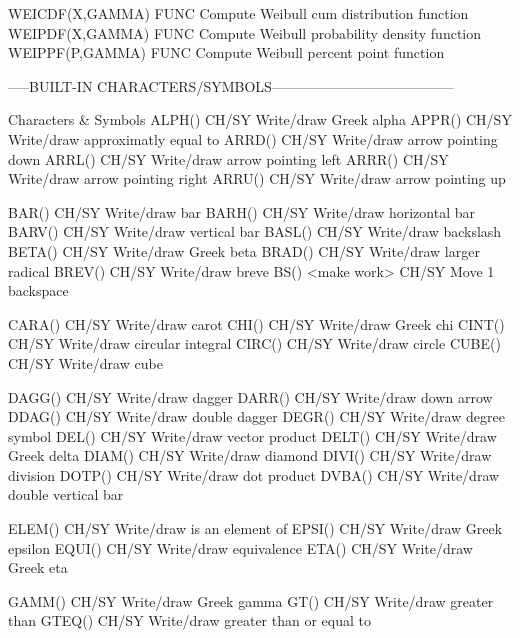 WEICDF(X,GAMMA)             FUNC  Compute Weibull cum distribution function
WEIPDF(X,GAMMA)             FUNC  Compute Weibull probability density function
WEIPPF(P,GAMMA)             FUNC  Compute Weibull percent point function

-----BUILT-IN CHARACTERS/SYMBOLS---------------------------------------

Characters & Symbols
ALPH()                      CH/SY Write/draw Greek alpha
APPR()                      CH/SY Write/draw approximatly equal to
ARRD()                      CH/SY Write/draw arrow pointing down
ARRL()                      CH/SY Write/draw arrow pointing left
ARRR()                      CH/SY Write/draw arrow pointing right
ARRU()                      CH/SY Write/draw arrow pointing up

BAR()                       CH/SY Write/draw bar
BARH()                      CH/SY Write/draw horizontal bar
BARV()                      CH/SY Write/draw vertical bar
BASL()                      CH/SY Write/draw backslash
BETA()                      CH/SY Write/draw Greek beta
BRAD()                      CH/SY Write/draw larger radical
BREV()                      CH/SY Write/draw breve
BS() <make work>            CH/SY Move 1 backspace

CARA()                      CH/SY Write/draw carot
CHI()                       CH/SY Write/draw Greek chi
CINT()                      CH/SY Write/draw circular integral
CIRC()                      CH/SY Write/draw circle
CUBE()                      CH/SY Write/draw cube

DAGG()                      CH/SY Write/draw dagger
DARR()                      CH/SY Write/draw down arrow
DDAG()                      CH/SY Write/draw double dagger
DEGR()                      CH/SY Write/draw degree symbol
DEL()                       CH/SY Write/draw vector product
DELT()                      CH/SY Write/draw Greek delta
DIAM()                      CH/SY Write/draw diamond
DIVI()                      CH/SY Write/draw division
DOTP()                      CH/SY Write/draw dot product
DVBA()                      CH/SY Write/draw double vertical bar

ELEM()                      CH/SY Write/draw is an element of
EPSI()                      CH/SY Write/draw Greek epsilon
EQUI()                      CH/SY Write/draw equivalence
ETA()                       CH/SY Write/draw Greek eta

GAMM()                      CH/SY Write/draw Greek gamma
GT()                        CH/SY Write/draw greater than
GTEQ()                      CH/SY Write/draw greater than or equal to

